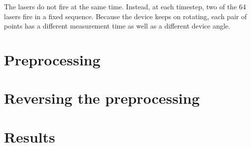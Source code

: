 \documentclass[english]{article}
\begin{document}
The lasers do not fire at the same time. Instead, at each timestep,
two of the 64 lasers fire in a fixed sequence. Because the device keeps
on rotating, each pair of points has a different measurement time as
well as a different device angle.



\section{Preprocessing}
\label{sec:preproc}

\section{Reversing the preprocessing}

\section{Results}



\end{document}

